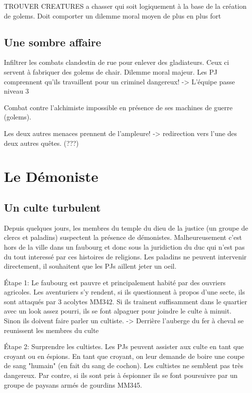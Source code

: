 TROUVER CREATURES a chasser qui soit logiquement à la base de la création de golems. Doit comporter
un dilemme moral moyen de plus en plus fort

\subsection{Une sombre affaire}

Infiltrer les combats clandestin de rue pour enlever des gladiateurs. Ceux ci servent à fabriquer
des golems de chair. Dilemme moral majeur. Les PJ comprennent qu'ils travaillent pour un criminel
dangereux!
 -> L'équipe passe niveau 3

Combat contre l'alchimiste impossible en présence de ses machines de guerre (golems).

Les deux autres menaces prennent de l'ampleure! -> redirection vers l'une des deux autres quêtes. (???)

\section{Le Démoniste}
\label{Demoniste}

\subsection{Un culte turbulent}

Depuis quelques jours, les membres du temple du dieu de la justice (un groupe de clercs et paladins) 
suspectent la présence de démonistes. Malheureusement c'est hors de la ville dans un faubourg 
et donc sous la juridiction du duc qui n'est pas du tout interessé par ces histoires de religions.
Les paladins ne peuvent intervenir directement, il souhaitent que les PJs aillent jeter un oeil.

Étape 1: Le faubourg est pauvre et principalement habité par des ouvriers agricoles. Les aventuriers
s'y rendent, si ils questionnent à propos d'une secte, ils sont attaqués par 3 acolytes MM342. Si ils
trainent suffisamment dans le quartier avec un look assez pourri, ils se font alpaguer pour joindre le 
culte à minuit. Sinon ils doivent faire parler un cultiste.
-> Derrière l'auberge du fer à cheval se reunissent les membres du culte

Étape 2: Surprendre les cultistes. Les PJs peuvent assister aux culte en tant que croyant ou en éspions.
En tant que croyant, on leur demande de boire une coupe de sang "humain" (en fait du sang de cochon).
Les cultistes ne semblent pas très dangereux. Par contre, si ils sont pris à éspionner ils se font 
poursuivre par un groupe de paysans armés de gourdins MM345.

